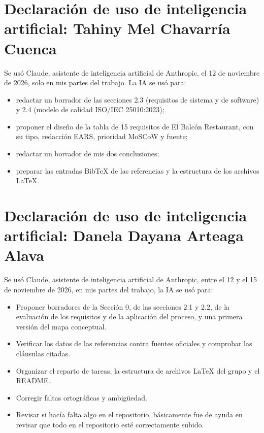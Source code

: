 
\section*{Declaraci\'on de uso de inteligencia artificial: Tahiny Mel Chavarr\'ia Cuenca}

Se us\'o Claude, asistente de inteligencia artificial de Anthropic, el 12 de noviembre de 2026, solo en mis partes del trabajo. La IA se us\'o para:

\begin{itemize}
  \item redactar un borrador de las secciones 2.3 (requisitos de sistema y de software) y 2.4 (modelo de calidad ISO/IEC 25010:2023);
  \item proponer el diseño de la tabla de 15 requisitos de El Balc\'on Restaurant, con su tipo, redacci\'on EARS, prioridad MoSCoW y fuente;
  \item redactar un borrador de mis dos conclusiones;
  \item preparar las entradas BibTeX de las referencias y la estructura de los archivos LaTeX.
\end{itemize}

\section*{Declaración de uso de inteligencia artificial: Danela Dayana Arteaga Alava}

Se usó Claude, asistente de inteligencia artificial de Anthropic, entre el 12 y el 15 de noviembre de 2026, en mis partes del trabajo, la IA se usó para:

\begin{itemize}
  \item Proponer borradores de la Sección 0, de las secciones 2.1 y 2.2, de la evaluación de los requisitos y de la aplicación del proceso, y una primera versión del mapa conceptual.
  \item Verificar los datos de las referencias contra fuentes oficiales y comprobar las cláusulas citadas.
  \item Organizar el reparto de tareas, la estructura de archivos LaTeX del grupo y el README.
  \item Corregir faltas ortográficas y ambigüedad.
  \item Revisar si hacía falta algo en el repositorio, básicamente fue de ayuda en revisar que todo en el repositorio esté correctamente subido.
\end{itemize}

